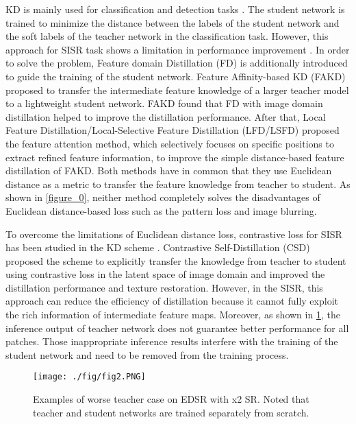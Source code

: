 \documentclass[10pt,twocolumn,letterpaper]{article}
\begin{document}
KD is mainly used for classification and detection tasks \cite{detection_kd, crd, detect_kd}. The student network is trained to minimize the distance between the labels of the student network and the soft labels of the teacher network in the classification task. However, this approach for SISR task shows a limitation in performance improvement \cite{lsfd, fitnet}. In order to solve the problem, Feature domain Distillation (FD) is additionally introduced to guide the training of the student network. Feature Affinity-based KD (FAKD) \cite{fakd} proposed to transfer the intermediate feature knowledge of a larger teacher model to a lightweight student network. FAKD found that FD with image domain distillation helped to improve the distillation performance. After that, Local Feature Distillation/Local-Selective Feature Distillation (LFD/LSFD) \cite{lsfd} proposed the feature attention method, which selectively focuses on specific positions to extract refined feature information, to improve the simple distance-based feature distillation of FAKD. Both methods have in common that they use Euclidean distance as a metric to transfer the feature knowledge from teacher to student. As shown in \cref{figure_0}, neither method completely solves the disadvantages of Euclidean distance-based loss such as the pattern loss and image blurring. 

To overcome the limitations of Euclidean distance loss, contrastive loss for SISR has been studied in the KD scheme \cite{srcrd, csd2021}. Contrastive Self-Distillation (CSD) \cite{csd2021} proposed the scheme to explicitly transfer the knowledge from teacher to student using contrastive loss in the latent space of image domain and improved the distillation performance and texture restoration. However, in the SISR, this approach can reduce the efficiency of distillation because it cannot fully exploit the rich information of intermediate feature maps. Moreover, as shown in \cref{figure_1}, the inference output of teacher network does not guarantee better performance for all patches. Those inappropriate inference results interfere with the training of the student network and need to be removed from the training process.

\begin{figure}
\centering
\texttt{[image: ./fig/fig2.PNG]}
\caption{Examples of worse teacher case on EDSR with x2 SR. Noted that teacher and student networks are trained separately from scratch.\label{figure_1}}
\end{figure}
\end{document}
